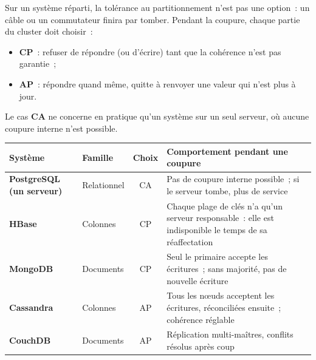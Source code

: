 \noindent Sur un système réparti, la tolérance au partitionnement n'est pas une option~: un câble ou un commutateur finira par tomber. Pendant la coupure, chaque partie du cluster doit choisir~:
\begin{itemize}
	\item \textbf{CP}~: refuser de répondre (ou d'écrire) tant que la cohérence n'est pas garantie~;
	\item \textbf{AP}~: répondre quand même, quitte à renvoyer une valeur qui n'est plus à jour.
\end{itemize}
Le cas \textbf{CA} ne concerne en pratique qu'un système sur un seul serveur, où aucune coupure interne n'est possible.

\begin{center}
\end{center}

\begin{center}
\small
\begin{tabularx}{\textwidth}{>{\bfseries}l l c >{\raggedright\arraybackslash}X}
\toprule
Système & Famille & Choix & Comportement pendant une coupure \\
\midrule
PostgreSQL (un serveur) & Relationnel & CA & Pas de coupure interne possible~; si le serveur tombe, plus de service \\
HBase & Colonnes & CP & Chaque plage de clés n'a qu'un serveur responsable~: elle est indisponible le temps de sa réaffectation \\
MongoDB & Documents & CP & Seul le primaire accepte les écritures~; sans majorité, pas de nouvelle écriture \\
Cassandra & Colonnes & AP & Tous les n\oe uds acceptent les écritures, réconciliées ensuite~; cohérence réglable \\
CouchDB & Documents & AP & Réplication multi-maîtres, conflits résolus après coup \\
\bottomrule
\end{tabularx}
\end{center}

